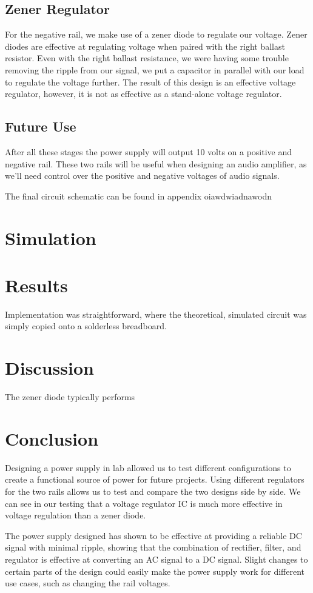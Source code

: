 \documentclass[12pt]{article}
\begin{document}
\subsection{Zener Regulator}
For the negative rail, we make use of a zener diode to regulate our voltage. Zener diodes are effective at regulating voltage when paired with the right ballast resistor. Even 
with the right ballast resistance, we were having some trouble removing the ripple from our signal, we put a capacitor in parallel with our load to regulate the voltage further. 
The result of this design is an effective voltage regulator, however, it is not as effective as a stand-alone voltage regulator.

\subsection{Future Use}
After all these stages the power supply will output 10 volts on a positive and negative rail. These two rails will be useful when designing an audio amplifier, as we'll need control over the 
positive and negative voltages of audio signals.


The final circuit schematic can be found in appendix oiawdwiadnawodn

\section{Simulation}

\section{Results}

Implementation was straightforward, where the theoretical, simulated circuit was simply
copied onto a solderless breadboard. 

\section{Discussion}

The zener diode typically performs

\section{Conclusion}
Designing a power supply in lab allowed us to test different configurations to create a functional source of power for future projects. 
Using different regulators for the two rails allows us to test and compare the two designs side by side. We can see in our testing that a voltage regulator IC is much more effective 
in voltage regulation than a zener diode.

The power supply designed has shown to be effective at providing a reliable DC signal with minimal ripple, showing that the combination of rectifier, filter, and regulator is effective 
at converting an AC signal to a DC signal. Slight changes to certain parts of the design could easily make the power supply work for different use cases, such as changing the rail voltages.
\end{document}

